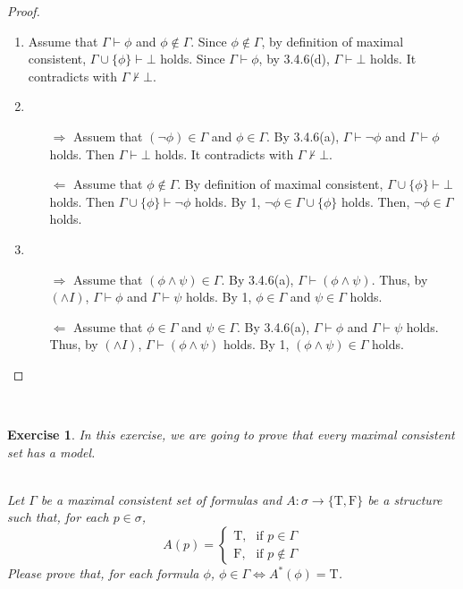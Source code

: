 \documentclass[12pt,a4paper]{article}
\theoremstyle{plain}
\newtheorem{exercise}{Exercise}
\theoremstyle{definition}
\begin{document}
\begin{proof}\
	\begin{enumerate}
    	\item
        Assume that $\Gamma \vdash \phi$ and \(\phi \notin \Gamma\). Since \(\phi \notin \Gamma\), by definition of maximal consistent,  $\Gamma \cup \{ \phi \} \vdash \bot$ holds. Since $\Gamma \vdash \phi$, by 3.4.6(d), \(\Gamma \vdash \bot \) holds. It contradicts with  $\Gamma \not \vdash \bot$.
    
        \item
        \begin{itemize}
            \item[$\Rightarrow$] 
            Assuem that $( \neg \phi ) \in \Gamma$ and $\phi \in \Gamma$. By 3.4.6(a), $\Gamma \vdash \neg \phi$ and $\Gamma \vdash \phi$ holds. Then $\Gamma \vdash \bot$ holds. It contradicts with  $\Gamma \not \vdash \bot$. 
            \item[$\Leftarrow$]
            Assume that $\phi \notin \Gamma$. By definition of maximal consistent,  $\Gamma \cup \{ \phi \} \vdash \bot$ holds. Then $\Gamma \cup \{ \phi \} \vdash \neg \phi$ holds. By 1, $\neg \phi \in \Gamma \cup \{ \phi \}$ holds. Then, $\neg \phi \in \Gamma $ holds.  
        \end{itemize}
        
        \item
        \begin{itemize}
            \item[$\Rightarrow$] 
            Assume that $(\phi \wedge \psi) \in \Gamma$. By 3.4.6(a), $\Gamma \vdash (\phi \wedge \psi)$. Thus, by $(\wedge I)$, $\Gamma \vdash \phi$ and $\Gamma \vdash \psi$ holds. By 1, $\phi \in \Gamma$ and $\psi \in \Gamma$ holds.
            \item[$\Leftarrow$]
            Assume that $\phi \in \Gamma$ and $\psi \in \Gamma$. By 3.4.6(a), $\Gamma \vdash \phi$ and $\Gamma \vdash \psi$ holds. Thus, by $(\wedge I)$, $\Gamma \vdash (\phi \wedge \psi)$ holds. By 1, $(\phi \wedge \psi) \in \Gamma$ holds.     
        \end{itemize}
	\end{enumerate}
	
\end{proof}

\ \\
\begin{exercise}
In this exercise, we are going to prove that every maximal consistent set has a model.

\ \\
Let $\Gamma$ be a maximal consistent set of formulas and $A : \sigma \rightarrow \{ \text{T} , \text{F} \}$ be a structure such that, for each $p \in \sigma$,
%
\[
A (p) = \left \{
\begin{array}{ll}
\text{T} , & \mbox{if } p \in \Gamma \\
\text{F} , & \mbox{if } p \not \in \Gamma
\end{array}
\right.
\]
%
Please prove that, for each formula $\phi$, $\phi \in \Gamma \Leftrightarrow A^* (\phi) = \text{T}$.
\end{exercise}
\end{document}
